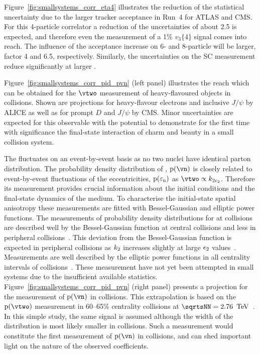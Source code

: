 \documentclass[../report.tex]{subfiles}
\begin{document}
Figure~\ref{fig:smallsystems_corr_eta4} illustrates the reduction of the statistical uncertainty due to the larger tracker acceptance in Run~4 for ATLAS and CMS. For this 4-particle correlator a reduction of the uncertainties of about 2.5 is expected, and therefore even the measurement of a 1\% $v_3\{4\}$ signal comes into reach. The influence of the acceptance increase on 6- and 8-particle will be larger, factor 4 and 6.5, respectively. Similarly, the uncertainties on the SC measurement reduce significantly at larger \pT.

Figure~\ref{fig:smallsystems_corr_pid_pvn} (left panel) illustrates the reach which can be obtained for the $\vtwo$ measurement of heavy-flavoured objects in \pPb collisions. Shown are projections for heavy-flavour electrons and inclusive $J/\psi$ by ALICE as well as for prompt $D$ and $J/\psi$ by CMS. Minor uncertainties are expected for this observable with the potential to demonstrate for the first time with significance the final-state interaction of charm and beauty in a small collision system.

The \vn fluctuates on an event-by-event basis as no two nuclei have identical parton distribution. The probability density distribution of \vn, ${\rm p}(\vn)$ is closely related to event-by-event fluctuations of the eccentricities, ${\rm p}(\varepsilon_{\rm{n}})$ as $\vtwo \propto k_{\rm{2}\epsilon_{\rm{2}}}$. Therefore its measurement provides crucial information about the initial conditions and the final-state dynamics of the medium. To characterise the initial-state spatial anisotropy these measurements are fitted with Bessel-Gaussian and elliptic power functions. The measurements of probability density distributions for \vtwo at \PbPb collisions are described well by the Bessel-Gaussian function at central collisions and less in peripheral collisions~\cite{Aad:2013xma,Sirunyan:2017fts,Acharya:2018lmh}. This deviation from the Bessel-Gaussian function is expected in peripheral collisions as $k_{\rm{2}}$ increases slightly at large $\epsilon_{\rm{2}}$ values~\cite{Jia:2014jca}. Measurements are well described by the elliptic power functions in all centrality intervals of \PbPb collisions~\cite{Sirunyan:2017fts}. These measurement have not yet been attempted in small systems due to the insufficient available statistics. Figure~\ref{fig:smallsystems_corr_pid_pvn} (right panel) presents a projection for the measurement of ${\rm p}(\vn)$ in \pp collisions. This extrapolation is based on the ${\rm p}(\vtwo)$ measurement in 60--65\% centrality \PbPb collisions at $\sqrtsNN = \unit[2.76]{\UTeV}$~\cite{Aad:2013xma}. In this simple study, the same signal is assumed although the width of the distribution is most likely smaller in \pp collisions. Such a measurement would constitute the first measurement of ${\rm p}(\vn)$ in \pp collisions, and can shed important light on the nature of the observed \vtwo coefficients.
\end{document}
